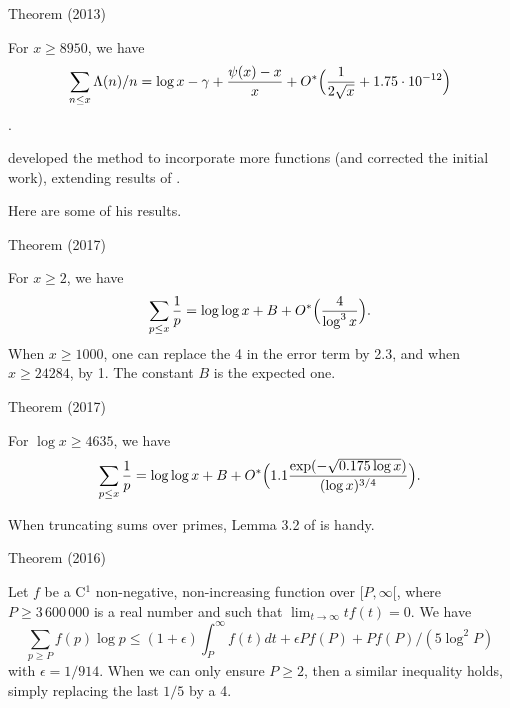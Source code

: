 \par 
\begin{thm}{Theorem (2013)}

  For $x\ge 8950$, we have
  $$
  \sum_{n\le x}\Lambda(n)/n=\log x-\gamma
  +\frac{\psi(x)-x}{x}+O^*\Bigl(\frac{1}{2\sqrt{x}}+1.75\cdot 10^{-12}\Bigl)
  $$.
\end{thm}



\cite{Vanlalnagaia*15-1}
developed the method to incorporate more functions (and corrected the
initial work), extending results of
\cite{Rosser-Schoenfeld*62}.

Here are some of his results.

\par 
\begin{thm}{Theorem (2017)}

  For $x\ge 2$, we have
  $$
  \sum_{p\le x}\frac1p=\log\log  x+B+O^*\Bigl(\frac{4}{\log^3x}\Bigr).
  $$
  When $x\ge 1000$, one can replace the 4 in the error term by 2.3,
  and when $x\ge24284$, by 1. The constant $B$ is the expected one.
\end{thm}



\par 
\begin{thm}{Theorem (2017)}

  For $\log x\ge 4635$, we have
  $$
  \sum_{p\le x}\frac1p=\log\log
  x+B+O^*\Bigl(1.1\frac{\exp(-\sqrt{0.175\log x})}{(\log x)^{3/4}}\Bigr).
  $$
\end{thm}






\par 
When truncating sums over primes, Lemma 3.2 of
\cite{Ramare*13d}
is handy.
\par 
\begin{thm}{Theorem (2016)}

  Let $f$ be a C${}^1$ non-negative, non-increasing function over
  $[P,\infty[$, where $P\ge 3\,600\,000$ is a real number and such
  that $\lim_{t\rightarrow\infty}tf(t)=0$. 
  We have
  \begin{equation*}
    \sum_{p\ge P} f(p)\log p
    \le (1+\epsilon) \int_P^\infty f(t) dt  +  \epsilon P f(P)  +  P
  f(P) / (5 \log^2 P) 
  \end{equation*}
  with $\epsilon=1/914$. When we can only ensure $P\ge2$, then a similar
  inequality holds, simply replacing the last $1/5$ by a 4.
\end{thm}


